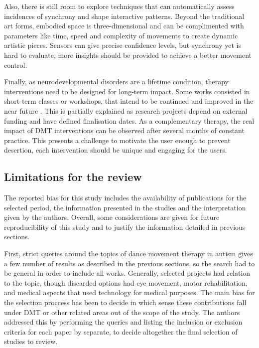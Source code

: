 \documentclass[a4paper,fleqn]{cas-sc}
\begin{document}
Also, there is still room to explore techniques that can automatically assess incidences of synchrony and shape interactive patterns. Beyond the traditional art forms, embodied space is three-dimensional and can be complimented with parameters like time, speed and complexity of movements to create dynamic artistic pieces. Sensors can give precise confidence levels, but synchrony yet is hard to evaluate, more insights should be provided to achieve a better movement control.

Finally, as neurodevelopmental disorders are a lifetime condition, therapy interventions need to be designed for long-term impact. Some works consisted in short-term classes or workshops, that intend to be continued and improved in the near future \cite{Caro18, Krichmar2018, Vargas20, Ragone22}. This is partially explained as research projects depend on external funding and have defined finalisation dates. As a complementary therapy, the real impact of DMT interventions can be observed after several months of constant practice. This presents a challenge to motivate the user enough to prevent desertion, each intervention should be unique and engaging for the users.



\subsection{Limitations for the review}
The reported bias for this study includes the availability of publications for the selected period, the information presented in the studies and the interpretation given by the authors. Overall, some considerations are given for future reproducibility of this study and to justify the information detailed in previous sections.

First, strict queries around the topics of dance movement therapy in autism gives a few number of results as described in the previous sections, so the search had to be general in order to include all works. Generally, selected projects had relation to the topic, though discarded options had eye movement, motor rehabilitation, and medical aspects that used technology for medical purposes. The main bias for the selection proccess has been to decide in which sense these contributions fall under DMT or other related areas out of the scope of the study. The authors addressed this by performing the queries and listing the inclusion or exclusion criteria for each paper by separate, to decide altogether the final selection of studies to review.
\end{document}
